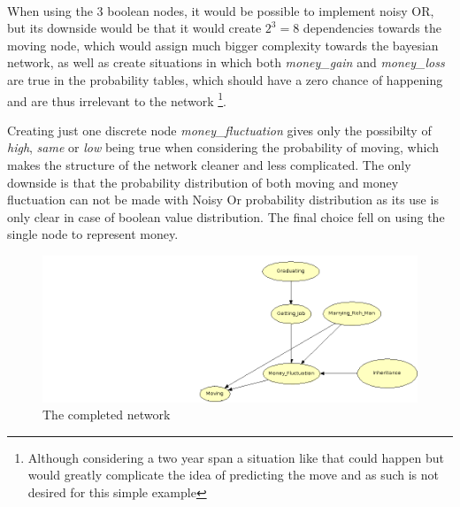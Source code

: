 \documentclass[12pt]{article} %
\begin{document}
\begin{figure}
    \centering
    \mbox{\quad
        }
    \label{fig12}
\end{figure}


When using the 3 boolean nodes, it would be possible to implement noisy OR, but its downside
would be that it would create $2^3 = 8 $  dependencies towards the moving
node, which would assign much bigger complexity towards the bayesian network, as
well as create situations in which both \emph{money\_gain} and
\emph{money\_loss} are true in the probability tables,  which should have a zero
chance of happening and are thus irrelevant to the network \footnote{Although
    considering a two year span a situation like that could happen but would greatly
    complicate the idea of predicting the move and as such is not desired for this
simple example}.

Creating just one discrete node \emph{money\_fluctuation} gives only the
possibilty of \emph{high}, \emph{same} or \emph{low} being true when
considering the probability of moving, which makes the structure of the network
cleaner and less complicated. The only downside is that the probability
distribution of both moving and money fluctuation can not be made with Noisy Or
probability distribution as
its  use is only clear in case of boolean value distribution. The final choice
fell on using the single node to represent money.

\begin{figure}[h!]
    \centering
    \includegraphics[width=1\textwidth]{network1}
    \caption{The completed network}
    \label{ref:money}
\end{figure}
\end{document}
